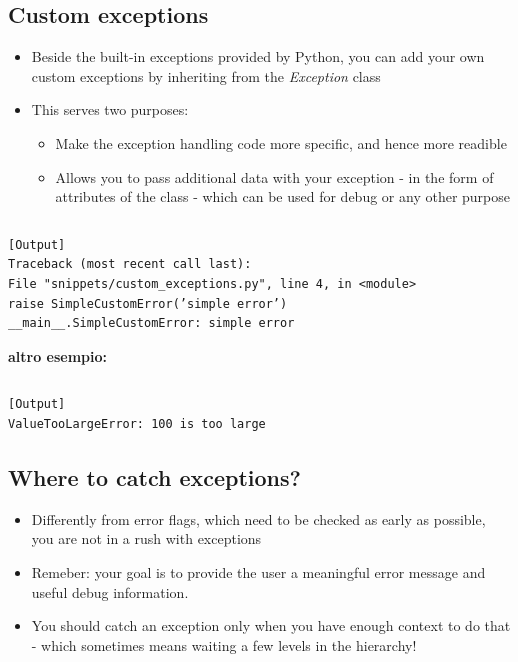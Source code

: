 \subsection{Custom exceptions}
  \begin{itemize}
    \item Beside the built-in exceptions provided by Python, you can add your
          own custom exceptions by inheriting from the \emph{Exception} class
    \medskip
    \item This serves two purposes:
    \begin{itemize}
      \item Make the exception handling code more specific, and hence more
            readible
      \item Allows you to pass additional data with your exception - in the
            form of attributes of the class - which can be used for debug
            or any other purpose
    \end{itemize}
  \end{itemize}

\inputminted{python}{snippets/custom_exceptions.py}
\begin{verbatim}
[Output]
Traceback (most recent call last):
File "snippets/custom_exceptions.py", line 4, in <module>
raise SimpleCustomError(’simple error’)
__main__.SimpleCustomError: simple error
\end{verbatim}

\textbf{altro esempio:}

\inputminted{python}{snippets/custom_exceptions_2.py}
\begin{verbatim}
[Output]
ValueTooLargeError: 100 is too large
\end{verbatim}


\subsection{Where to catch exceptions?}
  \begin{itemize}
    \item Differently from error flags, which need to be checked as early as
          possible, you are not in a rush with exceptions
    \item Remeber: your goal is to provide the user a meaningful error message and
          useful debug information.
    \item You should catch an exception only when you have enough context to
          do that - which sometimes means waiting a few levels in the hierarchy!
  \end{itemize}

